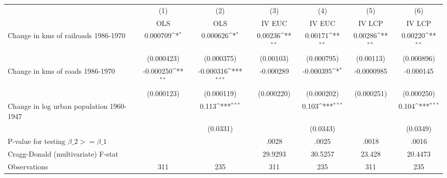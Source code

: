 {
\def\sym#1{\ifmmode^{#1}\else\(^{#1}\)\fi}
\begin{tabular}{l*{6}{c}}
\hline\hline
                &\multicolumn{1}{c}{(1)}&\multicolumn{1}{c}{(2)}&\multicolumn{1}{c}{(3)}&\multicolumn{1}{c}{(4)}&\multicolumn{1}{c}{(5)}&\multicolumn{1}{c}{(6)}\\
                &\multicolumn{1}{c}{OLS}&\multicolumn{1}{c}{OLS}&\multicolumn{1}{c}{IV EUC}&\multicolumn{1}{c}{IV EUC}&\multicolumn{1}{c}{IV LCP}&\multicolumn{1}{c}{IV LCP}\\
\hline
Change in kms of railroads 1986-1970& 0.000709\sym{*}  & 0.000626\sym{*}  &  0.00236\sym{**} &  0.00171\sym{**} &  0.00286\sym{**} &  0.00220\sym{**} \\
                &(0.000423)         &(0.000375)         &(0.00103)         &(0.000795)         &(0.00113)         &(0.000896)         \\
[1em]
Change in kms of roads 1986-1970&-0.000250\sym{**} &-0.000316\sym{***}&-0.000289         &-0.000395\sym{*}  &-0.0000985         &-0.000145         \\
                &(0.000123)         &(0.000119)         &(0.000220)         &(0.000202)         &(0.000251)         &(0.000250)         \\
[1em]
Change in log urban population 1960-1947&                  &    0.113\sym{***}&                  &    0.103\sym{***}&                  &    0.104\sym{***}\\
                &                  & (0.0331)         &                  & (0.0343)         &                  & (0.0349)         \\
\hline
P-value for testing $\beta\_{2} >= \beta\_{1}$&                  &                  &    .0028         &    .0025         &    .0018         &    .0016         \\
Cragg-Donald (multivariate) F-stat&                  &                  &  29.9293         &  30.5257         &   23.428         &  20.4473         \\
Observations    &      311         &      235         &      311         &      235         &      311         &      235         \\
\hline\hline
\end{tabular}
}
